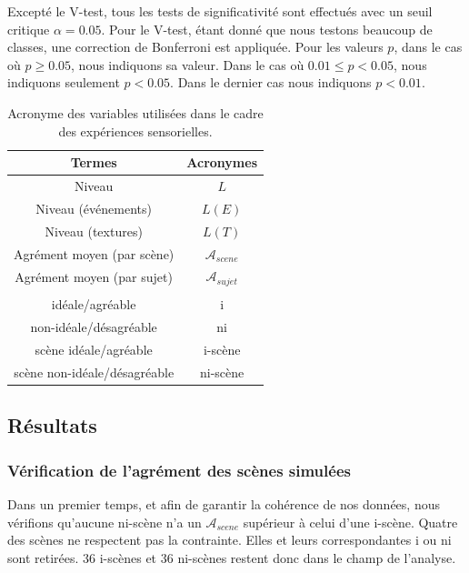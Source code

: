 \documentclass[twoside,twocolumn]{article}
\begin{document}
Excepté le V-test, tous les tests de significativité sont effectués avec un seuil critique $\alpha=0.05$. Pour le V-test, étant donné que nous testons beaucoup de classes, une correction de Bonferroni est appliquée. Pour les valeurs $p$, dans le cas où $p\geq0.05$, nous indiquons sa valeur. Dans le cas où $0.01\leq p<0.05$, nous indiquons seulement $p<0.05$. Dans le dernier cas nous indiquons $p<0.01$.

\begin{table}[t]
\centering
\begin{tabular}{c c}
Termes                         & Acronymes              \\
\hline
Niveau                         & $L$                    \\
Niveau (événements)            & $L(E)$                 \\
Niveau (textures)              & $L(T)$                 \\
Agrément moyen (par scène)     & $\mathcal{A}_{scene}$  \\
Agrément moyen (par sujet)     & $\mathcal{A}_{sujet}$  \\
                               &                        \\
idéale/agréable                & i                      \\
non-idéale/désagréable         & ni                     \\
scène idéale/agréable          & i-scène                \\
scène non-idéale/désagréable   & ni-scène               \\
\hline
\end{tabular}
\vspace{0.5mm}
\caption{Acronyme des variables utilisées dans le cadre des expériences sensorielles.}
\label{tab:acronyme}
\end{table}

\subsection{Résultats}

\subsubsection*{Vérification de l'agrément des scènes simulées}

Dans un premier temps, et afin de garantir la cohérence de nos données, nous vérifions qu'aucune ni-scène n'a un $\mathcal{A}_{scene}$ supérieur à celui d'une i-scène. Quatre des scènes ne respectent pas la contrainte. Elles et leurs correspondantes i ou ni sont retirées. 36 i-scènes et 36 ni-scènes restent donc dans le champ de l'analyse.
\end{document}

